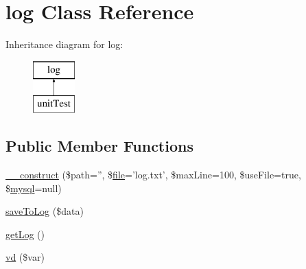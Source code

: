 \hypertarget{classlog}{\section{log Class Reference}
\label{classlog}
}
Inheritance diagram for log\-:\begin{figure}[H]
\begin{center}
\leavevmode
\includegraphics[height=2.000000cm]{classlog}
\end{center}
\end{figure}
\subsection*{Public Member Functions}
\begin{DoxyCompactItemize}
\item 
\hyperlink{classlog_a8e1fbdd4def82189306a52735bd0c70a}{\-\_\-\-\_\-construct} (\$path='', \$\hyperlink{classfile}{file}='log.\-txt', \$max\-Line=100, \$use\-File=true, \$\hyperlink{classmysql}{mysql}=null)
\item 
\hyperlink{classlog_ac4cd1cd9ecb5bdcbf0abfe30f276c430}{save\-To\-Log} (\$data)
\item 
\hyperlink{classlog_af8283af3e7c972d9c276dc634eec0bdc}{get\-Log} ()
\item 
\hyperlink{classlog_ae34a906558f554ea9f61bb2f8f355191}{vd} (\$var)
\end{DoxyCompactItemize}

